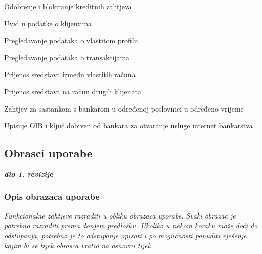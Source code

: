 \begin{packed_enum}
				\begin{packed_enum}
					
					\item Odobrenje i blokiranje kreditnih zahtjeva
					\item Uvid u podatke o klijentima
					
				\end{packed_enum}
				
				\item	{}
				
				\begin{packed_enum}
					
					\item Pregledavanje podataka o vlastitom profilu
					\item Pregledavanje podataka o transakcijama
					\item Prijenos sredstava između vlastitih računa
					\item Prijenos sredstava na račun drugih klijenata
					\item Zahtjev za sastankom s bankarom u određenoj poslovnici u određeno vrijeme
					
				\end{packed_enum}
				
				\item	{}
				
				\begin{packed_enum}
					
					\item Upisuje OIB i ključ dobiven od bankara za otvaranje usluge internet bankarstva
					
				\end{packed_enum}
			
			\end{packed_enum}
			
			\eject 
			
			
				
			\subsection{Obrasci uporabe}
				
				\textbf{\textit{dio 1. revizije}}
				
				\subsubsection{Opis obrazaca uporabe}
					\textit{Funkcionalne zahtjeve razraditi u obliku obrazaca uporabe. Svaki obrazac je potrebno razraditi prema donjem predlošku. Ukoliko u nekom koraku može doći do odstupanja, potrebno je to odstupanje opisati i po mogućnosti ponuditi rješenje kojim bi se tijek obrasca vratio na osnovni tijek.}\\
					

